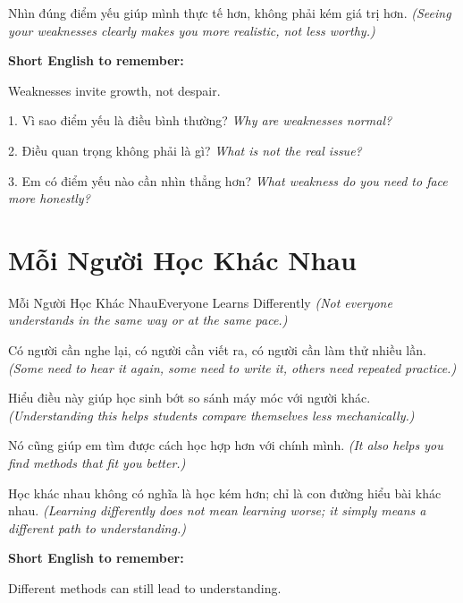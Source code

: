 \begin{baihoc}
Nhìn đúng điểm yếu giúp mình thực tế hơn, không phải kém giá trị hơn.
\textit{(Seeing your weaknesses clearly makes you more realistic, not less worthy.)}
\end{baihoc}

\begin{ghinhoanh}
\textbf{Short English to remember:}

Weaknesses invite growth, not despair.

\end{ghinhoanh}

\begin{tuhocnhanh}
1. Vì sao điểm yếu là điều bình thường? \textit{Why are weaknesses normal?}

2. Điều quan trọng không phải là gì? \textit{What is not the real issue?}

3. Em có điểm yếu nào cần nhìn thẳng hơn? \textit{What weakness do you need to face more honestly?}
\end{tuhocnhanh}
\ngancach

\section{Mỗi Người Học Khác Nhau}
\begin{truyen}{Mỗi Người Học Khác Nhau}{Everyone Learns Differently}
\textit{(Not everyone understands in the same way or at the same pace.)}

Có người cần nghe lại, có người cần viết ra, có người cần làm thử nhiều lần.
\textit{(Some need to hear it again, some need to write it, others need repeated practice.)}

Hiểu điều này giúp học sinh bớt so sánh máy móc với người khác.
\textit{(Understanding this helps students compare themselves less mechanically.)}

Nó cũng giúp em tìm được cách học hợp hơn với chính mình.
\textit{(It also helps you find methods that fit you better.)}
\end{truyen}

\begin{baihoc}
Học khác nhau không có nghĩa là học kém hơn; chỉ là con đường hiểu bài khác nhau.
\textit{(Learning differently does not mean learning worse; it simply means a different path to understanding.)}
\end{baihoc}

\begin{ghinhoanh}
\textbf{Short English to remember:}

Different methods can still lead to understanding.

\end{ghinhoanh}

